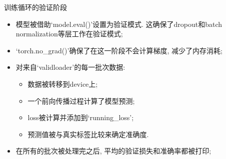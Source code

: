 \documentclass{beamer}
\begin{document}
\begin{frame}[fragile]{训练循环的验证阶段}
	\begin{itemize}
		\item 模型被借助`model.eval()'设置为验证模式. 这确保了dropout和batch normalization等层工作在验证模式;
		\item `torch.no\_grad()'确保了在这一阶段不会计算梯度, 减少了内存消耗;
		\item 对来自`validloader'的每一批次数据:
		      \begin{itemize}
			      \item 数据被转移到device上;
			      \item 一个前向传播过程计算了模型预测;
			      \item loss被计算并添加到`running\_loss';
			      \item 预测值被与真实标签比较来确定准确度.
		      \end{itemize}
		\item 在所有的批次被处理完之后, 平均的验证损失和准确率都被打印;
	\end{itemize}
\end{frame}
\end{document}

